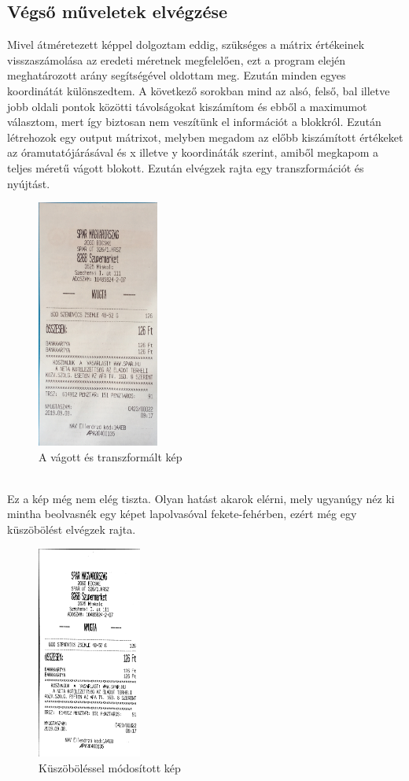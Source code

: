 \documentclass[a4paper,12pt]{article}
\begin{document}
\subsection{Végső műveletek elvégzése}

Mivel átméretezett képpel dolgoztam eddig, szükséges a mátrix értékeinek visszaszámolása az eredeti méretnek megfelelően, ezt a program elején meghatározott arány segítségével oldottam meg. Ezután minden egyes koordinátát különszedtem. A következő sorokban mind az alsó, felső, bal illetve jobb oldali pontok közötti távolságokat kiszámítom és ebből a maximumot választom, mert így biztosan nem veszítünk el információt a blokkról. Ezután létrehozok egy output mátrixot, melyben megadom az előbb kiszámított értékeket az óramutatójárásával és x illetve y koordináták szerint, amiből megkapom a teljes méretű vágott blokott. Ezután elvégzek rajta egy transzformációt és nyújtást.
\begin{figure}[h]
	\centering
	\includegraphics[width=4cm]{7d_warped}
	\caption{A vágott és transzformált kép}
\end{figure}
\\Ez a kép még nem elég tiszta. Olyan hatást akarok elérni, mely ugyanúgy néz ki mintha beolvasnék egy képet lapolvasóval fekete-fehérben, ezért még egy küszöbölést elvégzek rajta.

\begin{figure}[h]
	\centering
	\includegraphics[height=7cm]{8d_final}
	\caption{Küszöböléssel módosított kép}
\end{figure}
\end{document}
